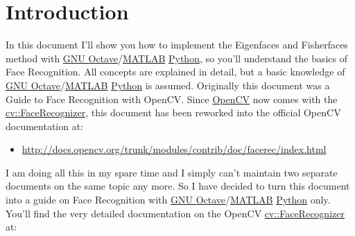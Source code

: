 \section{Introduction}

In this document I'll show you how to implement the Eigenfaces \cite{PT91} and Fisherfaces \cite{belhumeru97} method with \ifx\python\undefined \href{http://www.gnu.org/software/octave/}{GNU Octave}/\href{http://www.mathworks.com}{MATLAB} \else \href{http://www.python.org}{Python}\fi{}, so you'll understand the basics of Face Recognition. All concepts are explained in detail, but a basic knowledge of \ifx\python\undefined \href{http://www.gnu.org/software/octave/}{GNU Octave}/\href{http://www.mathworks.com}{MATLAB} \else \href{http://www.python.org}{Python}\fi{} is assumed. Originally this document was a Guide to Face Recognition with OpenCV. Since \href{http://www.opencv.org}{OpenCV} now comes with the \href{http://docs.opencv.org/trunk/modules/contrib/doc/facerec/facerec_api.html}{cv::FaceRecognizer}, this document has been reworked into the official OpenCV documentation at:

\begin{itemize}
  \item \href{http://docs.opencv.org/trunk/modules/contrib/doc/facerec/index.html}{http://docs.opencv.org/trunk/modules/contrib/doc/facerec/index.html}
\end{itemize}

I am doing all this in my spare time and I simply can't maintain two separate documents on the same topic any more. So I have decided to turn this document into a guide on Face Recognition with \ifx\python\undefined \href{http://www.gnu.org/software/octave/}{GNU Octave}/\href{http://www.mathworks.com}{MATLAB} \else \href{http://www.python.org}{Python}\fi{} only. You'll find the very detailed documentation on the OpenCV \href{http://docs.opencv.org/trunk/modules/contrib/doc/facerec/facerec_api.html}{cv::FaceRecognizer} at:

